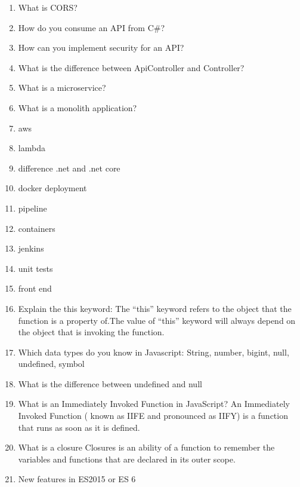 \begin{multicols}{2}
\begin{enumerate}
\item What is CORS?
\item How do you consume an API from C\#?
\item How can you implement security for an API?
\item What is the difference between ApiController and Controller?
\item What is a microservice?
\item What is a monolith application?
\item aws
\item lambda
\item difference .net and .net core
\item docker deployment
\item pipeline
\item containers
\item jenkins
\item unit tests
\item front end
\item Explain the this keyword: The “this” keyword refers to the object that the function is a property of.The value of “this” keyword will always depend on the object that is invoking the function.
\item Which data types do you know in Javascript: String, number, bigint, null, undefined, symbol
\item What is the difference between undefined and null
\item What is an Immediately Invoked Function in JavaScript? An Immediately Invoked Function ( known as IIFE and pronounced as IIFY) is a function that runs as soon as it is defined.
\item What is a closure Closures is an ability of a function to remember the variables and functions that are declared in its outer scope.
\item New features in ES2015 or ES 6
\end{enumerate}
\end{multicols}
